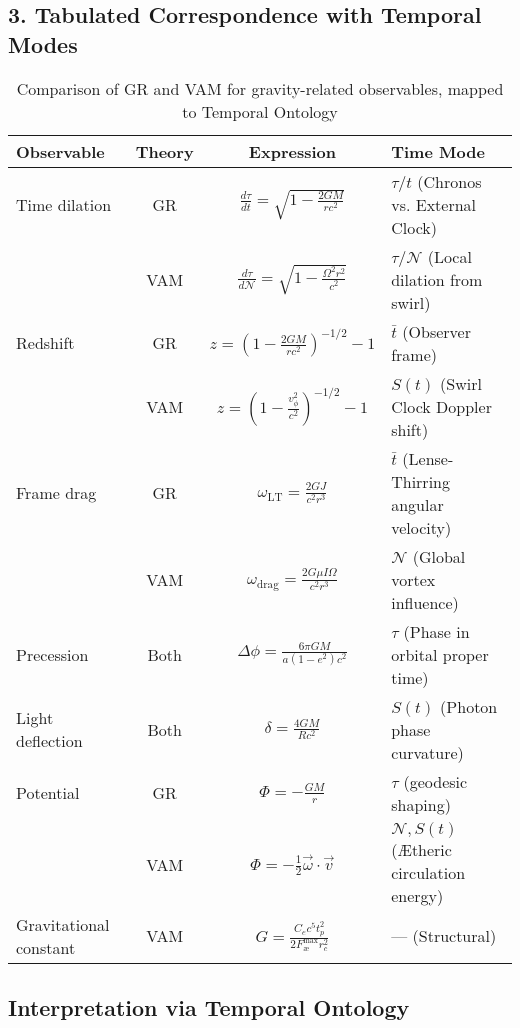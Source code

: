 \subsection*{3. Tabulated Correspondence with Temporal Modes}

\begin{table}[ht]
\centering
\caption{Comparison of GR and VAM for gravity-related observables, mapped to Temporal Ontology}
\label{tab:VAM-GR-temporal}
\begin{tabular}{|l|c|c|l|}
\hline
\textbf{Observable} & \textbf{Theory} & \textbf{Expression} & \textbf{Time Mode} \\
\hline
Time dilation &
GR & \( \frac{d\tau}{dt} = \sqrt{1 - \frac{2GM}{rc^2}} \) & \( \tau / t \) (Chronos vs. External Clock) \\
& VAM & \( \frac{d\tau}{d\mathcal{N}} = \sqrt{1 - \frac{\Omega^2 r^2}{c^2}} \) & \( \tau / \mathcal{N} \) (Local dilation from swirl) \\
\hline
Redshift &
GR & \( z = \left(1 - \frac{2GM}{rc^2} \right)^{-1/2} - 1 \) & \( \bar{t} \) (Observer frame) \\
& VAM & \( z = \left(1 - \frac{v_\phi^2}{c^2} \right)^{-1/2} - 1 \) & \( S(t) \) (Swirl Clock Doppler shift) \\
\hline
Frame drag &
GR & \( \omega_{\text{LT}} = \frac{2GJ}{c^2 r^3} \) & \( \bar{t} \) (Lense-Thirring angular velocity) \\
& VAM & \( \omega_{\text{drag}} = \frac{2G \mu I \Omega}{c^2 r^3} \) & \( \mathcal{N} \) (Global vortex influence) \\
\hline
Precession &
Both & \( \Delta\phi = \frac{6\pi GM}{a(1 - e^2)c^2} \) & \( \tau \) (Phase in orbital proper time) \\
\hline
Light deflection &
Both & \( \delta = \frac{4GM}{Rc^2} \) & \( S(t) \) (Photon phase curvature) \\
\hline
Potential &
GR & \( \Phi = -\frac{GM}{r} \) & \( \tau \) (geodesic shaping) \\
& VAM & \( \Phi = -\frac{1}{2} \vec{\omega} \cdot \vec{v} \) & \( \mathcal{N}, S(t) \) (Ætheric circulation energy) \\
\hline
Gravitational constant &
VAM & \( G = \frac{C_e c^5 t_p^2}{2 F_{\text{\ae}}^{\text{max}} r_c^2} \) & — (Structural) \\
\hline
\end{tabular}
\end{table}

\subsection*{Interpretation via Temporal Ontology}


